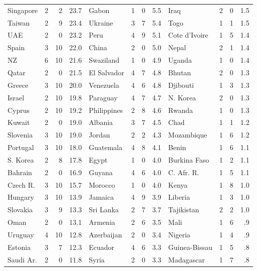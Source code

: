 \begin{table}
{\begin{ttfamily}
\begin{tabular}{|lrrr|lrrr|lrrr|}
Singapore     & 2 &  2 &23.7 &Gabon         & 1 &  0 & 5.5&Iraq         &2& 0&  1.5\\
Taiwan        & 2 &  9 &23.4 &Ukraine       & 3 &  7 & 5.4&Togo         &1& 1&  1.5\\
UAE           & 2 &  0 &23.2 &Peru          & 4 &  9 & 5.1&Cote d'Ivoire&1& 5&  1.4\\
Spain         & 3 & 10 &22.0 &China         & 2 &  0 & 5.0&Nepal        &2& 1&  1.4\\
NZ            & 6 & 10 &21.6 &Swaziland     & 1 &  0 & 4.9&Uganda       &1& 0&  1.4\\
Qatar         & 2 &  0 &21.5 &El Salvador   & 4 &  7 & 4.8&Bhutan       &2& 0&  1.3\\
Greece        & 3 & 10 &20.0 &Venezuela     & 4 &  6 & 4.8&Djibouti     &1& 3&  1.3\\
Israel        & 2 & 10 &19.8 &Paraguay      & 4 &  7 & 4.7&N. Korea     &2& 0&  1.3\\
Cyprus        & 2 & 10 &19.2 &Philippines   & 2 &  8 & 4.6&Rwanda       &1& 0&  1.3\\
Kuwait        & 2 &  0 &19.0 &Albania       & 3 &  7 & 4.5&Chad         &1& 1&  1.2\\
Slovenia      & 3 & 10 &19.0 &Jordan        & 2 &  2 & 4.3&Mozambique   &1& 6&  1.2\\
Portugal      & 3 & 10 &18.0 &Guatemala     & 4 &  8 & 4.1&Benin        &1& 6&  1.1\\
S. Korea      & 2 &  8 &17.8 &Egypt         & 1 &  0 & 4.0&Burkina Faso &1& 2&  1.1\\
Bahrain       & 2 &  0 &16.9 &Guyana        & 4 &  6 & 4.0&C. Afr. R.   &1& 5&  1.1\\
Czech R.      & 3 & 10 &15.7 &Morocco       & 1 &  0 & 4.0&Kenya        &1& 8&  1.0\\
Hungary       & 3 & 10 &13.9 &Jamaica       & 4 &  9 & 3.9&Liberia      &1& 3&  1.0\\
Slovakia      & 3 &  9 &13.3 &Sri Lanka     & 2 &  7 & 3.7&Tajikistan   &2& 2&  1.0\\
Oman          & 2 &  0 &13.1 &Armenia       & 2 &  6 & 3.5&Mali         &1& 6&   .9\\
Uruguay       & 4 & 10 &12.8 &Azerbaijan    & 2 &  0 & 3.4&Nigeria      &1& 4&   .9\\
Estonia       & 3 &  7 &12.3 &Ecuador       & 4 &  6 & 3.3&Guinea-Bissau&1& 5&   .8\\
Saudi Ar.     & 2 &  0 &11.8 &Syria         & 2 &  0 & 3.3&Madagascar   &1& 7&   .8\\

\end{tabular}
\end{ttfamily}}
\end{table}
